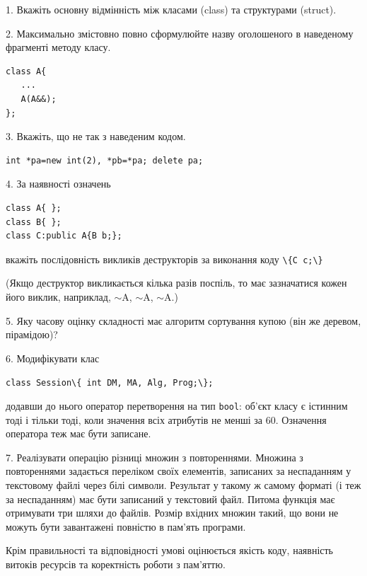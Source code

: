 \documentclass[12pt, ukrainian]{article}
\def\code#1{\Verb!#1!}
\begin{document}
{%
1. Вкажіть основну відмінність між класами (class) та структурами (struct).%
\par
\vspace{2mm}
2. Максимально змістовно повно сформулюйте назву оголошеного в наведеному фрагменті методу класу.
\vspace{-3mm}
\begin{verbatim}class A{
   ...
   A(A&&);
};\end{verbatim}
\vspace{-3mm}
\par
\vspace{2mm}
3. Вкажіть, що не так з наведеним кодом.
\vspace{-3mm}
\begin{verbatim}int *pa=new int(2), *pb=*pa; delete pa;\end{verbatim}
\vspace{-3mm}
\par
\vspace{2mm}
4. За наявності означень
\vspace{-3mm}
\begin{verbatim}
class A{ };
class B{ };
class C:public A{B b;};\end{verbatim}
\vspace{-3mm}
вкажіть послідовність викликів деструкторів за виконання коду \code{\{C c;\}} 

(Якщо деструктор викликається кілька разів поспіль, то має зазначатися кожен його виклик, наприклад, $\sim$A, $\sim$A, $\sim$A.)

\vspace{2mm}
5. Яку часову оцінку складності має алгоритм сортування купою (він же деревом, пірамідою)?
\par
\vspace{2mm}
6. Модифікувати клас 

\qquad\code{class Session\{ int DM, MA, Alg, Prog;\};} 


додавши до нього оператор перетворення на тип \code{bool}: об'єкт класу є істинним тоді і тільки тоді, коли значення всіх атрибутів не менші за 60. Означення оператора теж має бути записане.%
\par
\vspace{2mm}
7. 
Реалізувати операцію різниці множин з повтореннями. Множина з повтореннями задається переліком своїх елементів, записаних за неспаданням у текстовому файлі через білі символи. Результат у такому ж самому форматі (і теж за неспаданням) має бути записаний у текстовий файл. Питома функція має отримувати три шляхи до файлів. Розмір вхідних множин такий, що вони не можуть бути завантажені повністю в пам’ять програми.

Крім правильності та відповідності умові оцінюється якість коду, наявність витоків ресурсів та коректність роботи з пам'яттю. 

}
\end{document}
